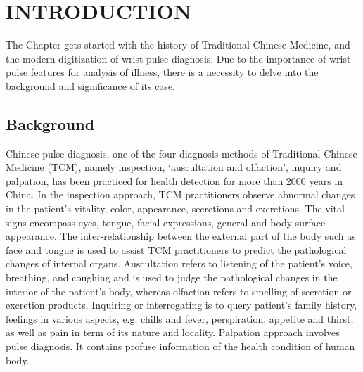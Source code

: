 \chapter[Introduction]{\uppercase{Introduction}}
\label{chap:one}
The Chapter gets started with the history of Traditional Chinese
Medicine, and the modern digitization of wrist pulse diagnosis.
Due to the importance of wrist pulse features for analysis of illness,
there is a necessity to delve into the background and significance of
its case. 

\section{Background}
Chinese pulse diagnosis, one of the four diagnosis methods of
Traditional Chinese Medicine (TCM), namely inspection, `auscultation
and olfaction', inquiry and palpation, has been practiced for health
detection for more than 2000 years in China.\cite{Huynh1985,Flaws1995}
In the inspection
approach, TCM practitioners observe abnormal changes in the patient’s
vitality, color, appearance, secretions and excretions. The vital
signs encompass eyes, tongue, facial expressions, general and body
surface appearance. The inter-relationship between the external part
of the body such as face and tongue is used to
assist TCM practitioners to predict the pathological changes of
internal organs. Auscultation refers to listening of the patient’s
voice, breathing, and coughing and is used to judge the pathological
changes in the interior of the patient’s body, whereas olfaction
refers to smelling of secretion or excretion products. Inquiring or
interrogating is to query patient’s family history, feelings in
various aspects, e.g. chills and fever, perspiration, appetite and
thirst, as well as pain in term of its nature and locality. Palpation
approach involves pulse diagnosis. It contains profuse information of
the health condition of human body. 

